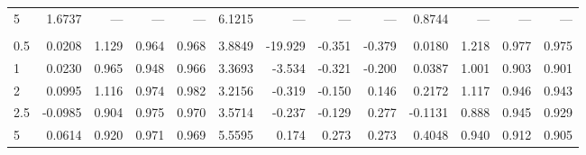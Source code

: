 \begin{tabular}{lrrrrrrrrrrrr}
5 & 1.6737 & --- & --- & --- & 6.1215 & --- & --- & --- & 0.8744 & --- & --- & --- \\
\addlinespace
\multicolumn{13}{l}{\textit{Sin-Het}} \\
0.5 & 0.0208 & 1.129 & 0.964 & 0.968 & 3.8849 & -19.929 & -0.351 & -0.379 & 0.0180 & 1.218 & 0.977 & 0.975 \\
1 & 0.0230 & 0.965 & 0.948 & 0.966 & 3.3693 & -3.534 & -0.321 & -0.200 & 0.0387 & 1.001 & 0.903 & 0.901 \\
2 & 0.0995 & 1.116 & 0.974 & 0.982 & 3.2156 & -0.319 & -0.150 & 0.146 & 0.2172 & 1.117 & 0.946 & 0.943 \\
2.5 & -0.0985 & 0.904 & 0.975 & 0.970 & 3.5714 & -0.237 & -0.129 & 0.277 & -0.1131 & 0.888 & 0.945 & 0.929 \\
5 & 0.0614 & 0.920 & 0.971 & 0.969 & 5.5595 & 0.174 & 0.273 & 0.273 & 0.4048 & 0.940 & 0.912 & 0.905 \\
\bottomrule
\end{tabular}
